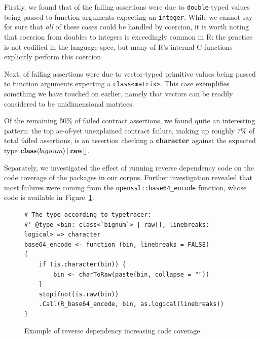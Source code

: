 \documentclass[acmsmall,review,anonymous]{acmart}\settopmatter{printfolios=true,printccs=false,printacmref=false}
\newcommand{\code}[1]{{\lstinline[style=Rin]!#1!}\xspace}
\begin{document}
Firstly, we found that  of the failing assertions were due to \code{double}-typed values being passed to function arguments expecting an \code{integer}.
While we cannot say for sure that {\it all} of these cases could be handled by coercion, it is worth noting that coercion from doubles to integers is exceedingly common in R: the practice is not codified in the language spec, but many of R's internal C functions explicitly perform this coercion.

Next,  of failing assertions were due to vector-typed primitive values being passed to function arguments expecting a \code{class<matrix>}.
This case exemplifies something we have touched on earlier, namely that vectors can be readily considered to be unidimensional matrices.

Of the remaining \~60\% of failed contract assertions, we found quite an interesting pattern: the top as-of-yet unexplained contract failure, making up roughly 7\% of total failed assertions, is an assertion checking a ${\bf character}$ against the expected type ${\bf class} \langle bignum \rangle \, | \, {\bf raw}[]$.

Separately, we investigated the effect of running reverse dependency code on the code coverage of the packages in our corpus.
Further investigation revealed that most failures were coming from the \code{openssl::base64_encode} function, whose code is available in Figure~\ref{fig:base64-encode}.

\begin{figure}[htbp]
\begin{center}

\begin{lstlisting}
# The type according to typetracer:
#' @type <bin: class<`bignum`> | raw[], linebreaks: logical> => character
base64_encode <- function (bin, linebreaks = FALSE) 
{
    if (is.character(bin)) {
        bin <- charToRaw(paste(bin, collapse = ""))
    }
    stopifnot(is.raw(bin))
    .Call(R_base64_encode, bin, as.logical(linebreaks))
}
\end{lstlisting}

\caption{Example of reverse dependency increasing code coverage.}
\label{fig:base64-encode}
\end{center}
\end{figure}
\end{document}
